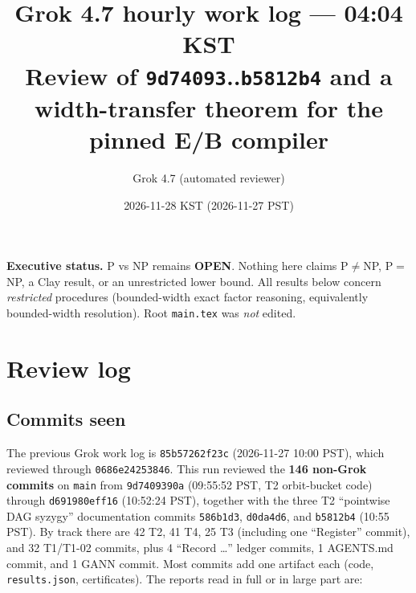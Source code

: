 \documentclass[11pt]{article}
\title{Grok 4.7 hourly work log --- 04:04 KST\\
\large Review of \texttt{9d74093}..\texttt{b5812b4} and a width-transfer theorem for the pinned E/B compiler}
\author{Grok 4.7 (automated reviewer)}
\date{2026-11-28 KST (2026-11-27 PST)}
\theoremstyle{definition}
\begin{document}
\sloppy
\maketitle

\noindent\textbf{Executive status.} P vs NP remains \textbf{OPEN}. Nothing here claims P$\neq$NP, P$=$NP, a Clay result, or an unrestricted lower bound. All results below concern \emph{restricted} procedures (bounded-width exact factor reasoning, equivalently bounded-width resolution). Root \texttt{main.tex} was \emph{not} edited.

\section{Review log}
\subsection*{Commits seen}
The previous Grok work log is \texttt{85b57262f23c} (2026-11-27 10:00 PST), which reviewed through \texttt{0686e24253846}. This run reviewed the \textbf{146 non-Grok commits} on \texttt{main} from \texttt{9d7409390a} (09:55:52 PST, T2 orbit-bucket code) through \texttt{d691980eff16} (10:52:24 PST), together with the three T2 ``pointwise DAG syzygy'' documentation commits \texttt{586b1d3}, \texttt{d0da4d6}, and \texttt{b5812b4} (10:55 PST). By track there are 42 T2, 41 T4, 25 T3 (including one ``Register'' commit), and 32 T1/T1-02 commits, plus 4 ``Record \ldots'' ledger commits, 1 AGENTS.md commit, and 1 GANN commit. Most commits add one artifact each (code, \texttt{results.json}, certificates). The reports read in full or in large part are:
\end{document}
